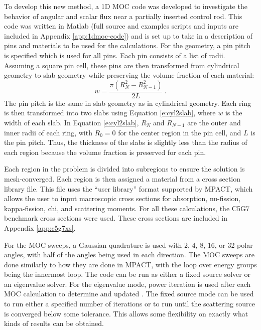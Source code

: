 To develop this new method, a 1D MOC code was developed to investigate the behavior of angular and scalar flux near a partially inserted control rod.  This code was written in Matlab \cite{MATLAB:2016} (full source and examples scripts and inputs are included in Appendix \ref{app:1dmoc-code}) and is set up to take in a description of pins and materials to be used for the calculations.  For the geometry, a pin pitch is specified which is used for all pins.  Each pin consists of a list of radii.  Assuming a square pin cell, these pins are then transformed from cylindrical geometry to slab geometry while preserving the volume fraction of each material:
\begin{equation}\label{e:cyl2slab}
w = \frac{\pi \left(R_N^2 - R_{N-1}^2\right)}{2 L}\ .
\end{equation}
The pin pitch is the same in slab geometry as in cylindrical geometry.  Each ring is then transformed into two slabs using Equation \ref{e:cyl2slab}, where $w$ is the width of each slab.  In Equation \ref{e:cyl2slab}, $R_N$ and $R_{N-1}$ are the outer and inner radii of each ring, with $R_0=0$ for the center region in the pin cell, and $L$ is the pin pitch.  Thus, the thickness of the slabs is slightly less than the radius of each region because the volume fraction is preserved for each pin.

Each region in the problem is divided into subregions to ensure the solution is mesh-converged.  Each region is then assigned a material from a cross section library file.  This file uses the ``user library'' format supported by MPACT, which allows the user to input macroscopic cross sections for absorption, nu-fission, kappa-fission, chi, and scattering moments.  For all these calculations, the C5G7 benchmark cross sections \cite{EELewisC5G72003,EELewisC5G7extended2005} were used.  These cross sections are included in Appendix \ref{app:c5g7xs}.

For the MOC sweeps, a Gaussian quadrature \cite{HandbookOfMathFunctions1972} is used with 2, 4, 8, 16, or 32 polar angles, with half of the angles being used in each direction.  The MOC sweeps are done similarly to how they are done in MPACT, with the loop over energy groups being the innermost loop.  The code can be run as either a fixed source solver or an eigenvalue solver.  For the eigenvalue mode, power iteration is used after each MOC calculation to determine and updated \keff{}.  The fixed source mode can be used to run either a specified number of iterations or to run until the scattering source is converged below some tolerance.  This allows some flexibility on exactly what kinds of results can be obtained.

